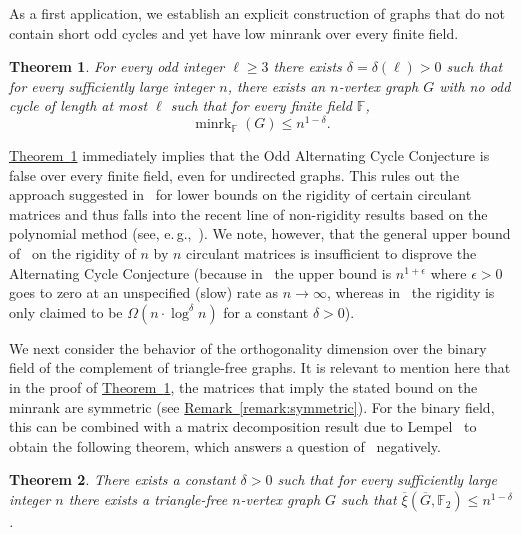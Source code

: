 \documentclass[11pt]{article}
\numberwithin{equation}{section}
\newtheorem{theorem}{Theorem}[section]
\theoremstyle{definition}
\theoremstyle{plain}
\newcommand{\expref}[2]{\hyperref[#2]{#1~\ref{#2}}}
\newcommand{\Fset}{\mathbb{F}}
\newcommand{\od}{\overline{\xi}}
\newcommand{\eps}{\epsilon}
\newcommand{\minrank}{\mathop{\mathrm{minrk}}}
\begin{document}
As a first application, we establish an explicit construction of graphs that do not contain short odd cycles and yet have low minrank over every finite field.
\begin{theorem}\label{thm:Intro_Cycles}
For every odd integer $\ell \geq 3$ there exists $\delta = \delta(\ell) >0$ such that for every sufficiently large integer $n$, there exists an $n$-vertex graph $G$ with no odd cycle of length at most $\ell$ such that for every finite field $\Fset$,
\[{\minrank}_{\Fset}(G) \leq n^{1-\delta}.\]
\end{theorem}
\noindent
\expref{Theorem}{thm:Intro_Cycles} immediately implies that the Odd Alternating Cycle Conjecture is false over every finite field, even for undirected graphs.
This rules out the approach suggested in~\cite{CodenottiPR00} for lower bounds on the rigidity of certain circulant matrices and thus falls into the recent line of non-rigidity results based on the polynomial method (see, e.\,g.,~\cite{AlmanW17,dvir2019matrix,DvirL19}).
We note, however, that the general upper bound of~\cite{DvirL19} on the rigidity of $n$ by $n$ circulant matrices
%
%
%
is insufficient to disprove the Alternating Cycle Conjecture
(because in~\cite{DvirL19} the upper bound is $n^{1+\eps}$
%
where $\eps > 0$ goes to zero at an unspecified (slow) rate
as $n\to\infty$,  %
whereas in~\cite{CodenottiPR00} the rigidity is only claimed to be
%
%
$\Omega(n \cdot \log^\delta n)$ for a constant $\delta > 0$).

We next consider the behavior of the orthogonality dimension over the binary field of the complement of triangle-free graphs.
It is relevant to mention here that in the proof of \expref{Theorem}{thm:Intro_Cycles}, the matrices that imply the stated bound on the minrank are symmetric (see \expref{Remark}{remark:symmetric}). For the binary field, this can be combined with a matrix decomposition result due to Lempel~\cite{Lempel75} to obtain the following theorem, which answers a question of~\cite{CodenottiPR00} negatively.
\begin{theorem}\label{thm:IntroTriangleFree}
There exists a constant $\delta >0$ such that for every sufficiently large integer $n$ there exists a triangle-free $n$-vertex graph $G$ such that $\od(\overline{G},\Fset_2) \leq n^{1-\delta}$.
\end{theorem}
\end{document}
